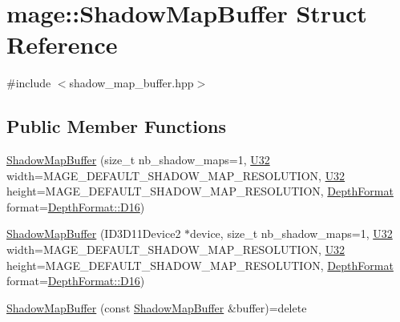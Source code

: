 \hypertarget{structmage_1_1_shadow_map_buffer}{}\section{mage\+:\+:Shadow\+Map\+Buffer Struct Reference}
\label{structmage_1_1_shadow_map_buffer}


{\ttfamily \#include $<$shadow\+\_\+map\+\_\+buffer.\+hpp$>$}

\subsection*{Public Member Functions}
\begin{DoxyCompactItemize}
\item 
\hyperlink{structmage_1_1_shadow_map_buffer_a9e8d08d9e1ddaf95bfe5ea759df28b45}{Shadow\+Map\+Buffer} (size\+\_\+t nb\+\_\+shadow\+\_\+maps=1, \hyperlink{namespacemage_a41c104c036fba3756a74e19f793eeaa1}{U32} width=M\+A\+G\+E\+\_\+\+D\+E\+F\+A\+U\+L\+T\+\_\+\+S\+H\+A\+D\+O\+W\+\_\+\+M\+A\+P\+\_\+\+R\+E\+S\+O\+L\+U\+T\+I\+ON, \hyperlink{namespacemage_a41c104c036fba3756a74e19f793eeaa1}{U32} height=M\+A\+G\+E\+\_\+\+D\+E\+F\+A\+U\+L\+T\+\_\+\+S\+H\+A\+D\+O\+W\+\_\+\+M\+A\+P\+\_\+\+R\+E\+S\+O\+L\+U\+T\+I\+ON, \hyperlink{namespacemage_aed4c3f883a30484d0a20762c06be81d4}{Depth\+Format} format=\hyperlink{namespacemage_aed4c3f883a30484d0a20762c06be81d4a6fd9ec81643ee5a57f85a71951bfe13d}{Depth\+Format\+::\+D16})
\item 
\hyperlink{structmage_1_1_shadow_map_buffer_ab770555b500f5b27f4aa872689902554}{Shadow\+Map\+Buffer} (I\+D3\+D11\+Device2 $\ast$device, size\+\_\+t nb\+\_\+shadow\+\_\+maps=1, \hyperlink{namespacemage_a41c104c036fba3756a74e19f793eeaa1}{U32} width=M\+A\+G\+E\+\_\+\+D\+E\+F\+A\+U\+L\+T\+\_\+\+S\+H\+A\+D\+O\+W\+\_\+\+M\+A\+P\+\_\+\+R\+E\+S\+O\+L\+U\+T\+I\+ON, \hyperlink{namespacemage_a41c104c036fba3756a74e19f793eeaa1}{U32} height=M\+A\+G\+E\+\_\+\+D\+E\+F\+A\+U\+L\+T\+\_\+\+S\+H\+A\+D\+O\+W\+\_\+\+M\+A\+P\+\_\+\+R\+E\+S\+O\+L\+U\+T\+I\+ON, \hyperlink{namespacemage_aed4c3f883a30484d0a20762c06be81d4}{Depth\+Format} format=\hyperlink{namespacemage_aed4c3f883a30484d0a20762c06be81d4a6fd9ec81643ee5a57f85a71951bfe13d}{Depth\+Format\+::\+D16})
\item 
\hyperlink{structmage_1_1_shadow_map_buffer_a276a32f787cda940ac36df461d0ce3ea}{Shadow\+Map\+Buffer} (const \hyperlink{structmage_1_1_shadow_map_buffer}{Shadow\+Map\+Buffer} \&buffer)=delete
\item 

\end{DoxyCompactItemize}
